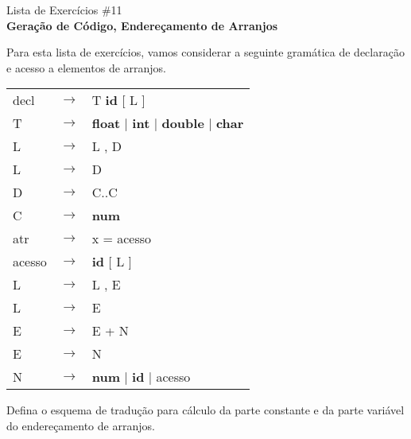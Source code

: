 \documentclass{compiladores}
\begin{document}
\begin{center}
{\LARGE Lista de Exercícios \#11}\\
{\bf Geração de Código, Endereçamento de Arranjos}
\end{center}

\bigskip

Para esta lista de exercícios, vamos considerar a seguinte gramática
de declaração e acesso a elementos de arranjos.

\begin{center}
\begin{tabular}{lll}
 decl  &  $\rightarrow$  &  T \textbf{id} [ L ]  \\
 T     &  $\rightarrow$  &  \textbf{float} $\vert{}$ \textbf{int} $\vert{}$ \textbf{double} $\vert{}$ \textbf{char}     \\
 L     &  $\rightarrow$  &  L , D                \\
 L     &  $\rightarrow$  &  D                    \\
 D     &  $\rightarrow$  &  C..C                 \\
 C     &  $\rightarrow$  &  \textbf{num}         \\
atr & $\rightarrow$      & x = acesso \\
 acesso  &  $\rightarrow$  &  \textbf{id} [ L ]                   \\
 L       &  $\rightarrow$  &  L , E                               \\
 L       &  $\rightarrow$  &  E                                   \\
 E       &  $\rightarrow$  &  E + N                               \\
 E       &  $\rightarrow$  &  N                                   \\
 N       &  $\rightarrow$  &  \textbf{num} $\vert{}$ \textbf{id} $\vert{}$ acesso \\
\end{tabular}
\end{center}

Defina o esquema de tradução para cálculo da parte constante e da
parte variável do endereçamento de arranjos.

\bigskip
\end{document}
